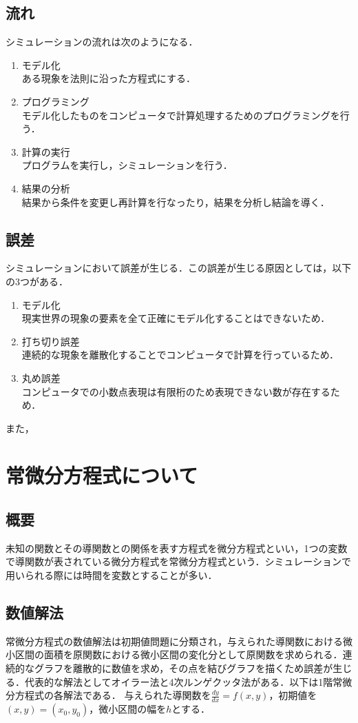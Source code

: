 \documentclass[a4paper, 12pt]{ltjsarticle}
\begin{document}
\subsection{流れ}
シミュレーションの流れは次のようになる．
\begin{enumerate}
\item モデル化\\
ある現象を法則に沿った方程式にする．
\item プログラミング\\
モデル化したものをコンピュータで計算処理するためのプログラミングを行う．
\item 計算の実行\\
プログラムを実行し，シミュレーションを行う．
\item 結果の分析\\
結果から条件を変更し再計算を行なったり，結果を分析し結論を導く．
\end{enumerate}
\subsection{誤差}
シミュレーションにおいて誤差が生じる．この誤差が生じる原因としては，以下の3つがある．
\begin{enumerate}
\item モデル化\\
現実世界の現象の要素を全て正確にモデル化することはできないため．
\item 打ち切り誤差\\
連続的な現象を離散化することでコンピュータで計算を行っているため．
\item 丸め誤差\\
コンピュータでの小数点表現は有限桁のため表現できない数が存在するため．
\end{enumerate}
また，

\section{常微分方程式について}
\subsection{概要}
未知の関数とその導関数との関係を表す方程式を微分方程式といい，1つの変数で導関数が表されている微分方程式を常微分方程式という．シミュレーションで用いられる際には時間を変数とすることが多い．
\subsection{数値解法}
常微分方程式の数値解法は初期値問題に分類され，与えられた導関数における微小区間の面積を原関数における微小区間の変化分として原関数を求められる．連続的なグラフを離散的に数値を求め，その点を結びグラフを描くため誤差が生じる．代表的な解法としてオイラー法と4次ルンゲクッタ法がある．以下は1階常微分方程式の各解法である．
与えられた導関数を$\frac{dy}{dx}=f(x,y)$，初期値を$(x,y)=(x_0,y_0)$，微小区間の幅を$h$とする．
\end{document}
